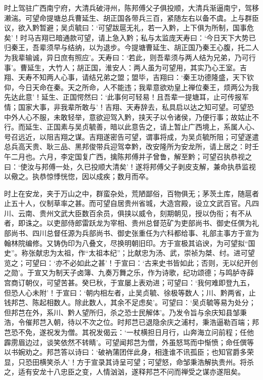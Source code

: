 \documentclass[]{article}
\begin{document}
时上驾驻广西南宁府，大清兵破浔州，陈邦傅父子俱投顺，大清兵渐逼南宁，驾移濑湍。可望命提塘总兵曹延生、胡正国各带兵三百，紧随左右以备不虞。上与群臣议，欲入黔暂避；吴贞毓曰：`可望跋扈无礼，若一入黔，上下俱为所制，国事危矣'！时马吉翔已暗通款可望，请上急入黔；私与太监庞天寿曰：`今日天下大势已归秦王，吾辈须早与结纳，以为退步。今提塘曹延生、胡正国乃秦王心腹，托二人为我辈输诚，异日庶有照应'。天寿曰：`若此，则吾辈须与两人结为兄弟，乃可行事'。曹延生，大竹人；胡正国，淮安人：两人虽为可望用，其实乃心王室。吉翔、天寿不知两人心事，请结兄弟之盟；盟毕，吉翔曰：`秦王功德隆盛，天下钦仰，今日天命在秦。天之所命，人不能违；我辈意欲劝皇上禅位秦王，烦两公为我先达此意'！延生、正国愕然曰：`此事何可轻易！且吾辈一提塘耳，止可传报军情；国家大事，非我辈所敢与'！吉翔、天寿辞去，私具启以达之知可望。可望恐中外人心不服，未敢轻举，意欲迎驾入黔，挟天子以令诸侯，乃便行事；故姑止不行。而延生、正国素与吴贞毓善，暗以此意告之，请上暂止广西境上，系属人心、号召远近，以阻吉翔之谋。吉翔遂密告可望，谓事将成，为吴贞毓所阻；可望遂遣总兵高天贵、耿三品、黑邦俊带兵迎驾幸黔，改安隆所为安龙所，请上居之：时壬午二月也。六月，李定国复广西，擒陈邦傅并子曾鲁，解至黔；可望召执恭视之曰：`使汝与邦傅一处，久已投顺大清矣'！遂将邦傅父子剥皮支解，兼命执恭监视以儆之。执恭惊悸恍惚，因以成疾；数月而卒。

时上在安龙，夹于万山之中，群蛮杂处，荒陋鄙俗，百物俱无；茅茨土库，随扈者止五十人，仪制草率之甚。而可望自居贵州省城，大造宫殿，设立文武百官。凡四川、云南、贵州文武大臣数百余员，俱挟以威令，刻期朝见，授以伪衔；有不从者，即诛之。以吏部侍郎雷跃龙为宰相、贵州总督范矿为吏部尚书、御史任僎为礼部尚书、四川总督任源为兵部尚书、御史张重任为六科都给事、礼部主事方于宣为翰林院编修。又铸伪印为八叠文，尽换明朝旧印。方于宣极其谄谀，为可望拟``国史''。称张献忠为太祖，作``太祖本纪''；比献忠为汤、武，崇祯为桀、纣。进可望览之；可望曰：`亦不必如此之甚'！于宣曰：`古来史书皆如此；否则，无以纪开创之勋'。于宣又为制天子卤簿、九奏万舞之乐，作为诗歌，纪功颂德；与鸣胪寺薛宫商订朝仪，可望苦甚。癸巳秋，于宣屡上表劝进；可望曰：`我何难即登九五，但恐人心未附'！于宣曰：`朝内相左者，止吴贞毓、徐极等数人；川、黔两省，止钱邦芑、陈起相数人。除此数人，其余不足虑矣'。可望曰：`吴贞毓等易为处分；但邦芑在外，系川、黔人望所归，杀之恐士民解体'。乃发令旨与余庆知县邹秉浩，令催邦芑入朝，待以不次之位。时邦芑已退隐余庆之浦村，秉浩逼勒百端；邦芑恐不免，遂祝发为僧。其祝发偈云：`一杖横担日月行，山奔海立问前程；任他霹雳眉边过，谈笑依然不转睛'。可望闻邦芑为僧，外虽怒骂而中惭愤；命任僎等以书婉劝之。邦芑答以诗曰：`破衲蒲团伴此身，相逢谁不讯孤臣；也知官爵多荣显，只恐田横笑杀人'！方于宣录其诗呈可望；可望怒，命邹秉浩解执贵州。将杀之，适有安龙十八忠臣之变，人情汹汹，遂释邦芑不问而禅受之谋亦遂阻矣。
\end{document}
